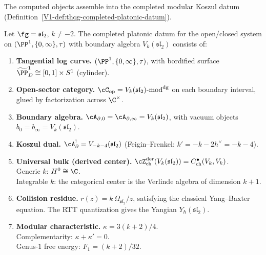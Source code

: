 The computed objects assemble into the completed
modular Koszul datum
(Definition~\ref*{V1-def:thqg-completed-platonic-datum}).

\begin{theorem}
\label{thm:benchmark-global-package}
Let $\fg = \mathfrak{sl}_2$, $k \ne -2$. The completed platonic
datum for the open/closed system on
$(\PP^1, \{0,\infty\}, \tau)$ with boundary algebra
$V_k(\mathfrak{sl}_2)$ consists of:
\begin{enumerate}[label=\textup{(\roman*)},nosep]
\item \textbf{Tangential log curve.}
 $(\PP^1, \{0,\infty\}, \tau)$, with bordified surface
 $\widetilde{\PP}^1_D \cong [0,1] \times S^1$
 \textup{(}cylinder\textup{)}.

\item \textbf{Open-sector category.}
 $\cC_{\mathrm{op}} = V_k(\mathfrak{sl}_2)\text{-mod}^{\mathrm{dg}}$
 on each boundary interval, glued by factorization across
 $\C^\times$.

\item \textbf{Boundary algebra.}
 $\cA_{\partial,0} = \cA_{\partial,\infty} = V_k(\mathfrak{sl}_2)$,
 with vacuum objects $b_0 = b_\infty = V_k(\mathfrak{sl}_2)$.

\item \textbf{Koszul dual.}
 $\cA_\partial^! = V_{-k-4}(\mathfrak{sl}_2)$
 \textup{(}Feigin--Frenkel: $k' = -k - 2h^\vee = -k-4$\textup{)}.

\item \textbf{Universal bulk \textup{(}derived center\textup{)}.}
 $\cZ^{\mathrm{der}}_{\mathrm{ch}}(V_k(\mathfrak{sl}_2))
 = C^\bullet_{\mathrm{ch}}(V_k, V_k)$. \\
 Generic $k$: $H^0 \cong \C$.\\
 Integrable $k$: the categorical center is the Verlinde algebra
 of dimension $k + 1$.

\item \textbf{Collision residue.}
 $r(z) = k\,\Omega_{\mathfrak{sl}_2}/z$,
 satisfying the classical Yang--Baxter equation.
 The RTT quantization gives the Yangian
 $Y_\hbar(\mathfrak{sl}_2)$.

\item \textbf{Modular characteristic.}
 $\kappa = 3(k+2)/4$. \\
 Complementarity: $\kappa + \kappa' = 0$.\\
 Genus-$1$ free energy: $F_1 = (k+2)/32$.


\end{enumerate}
\end{theorem}
